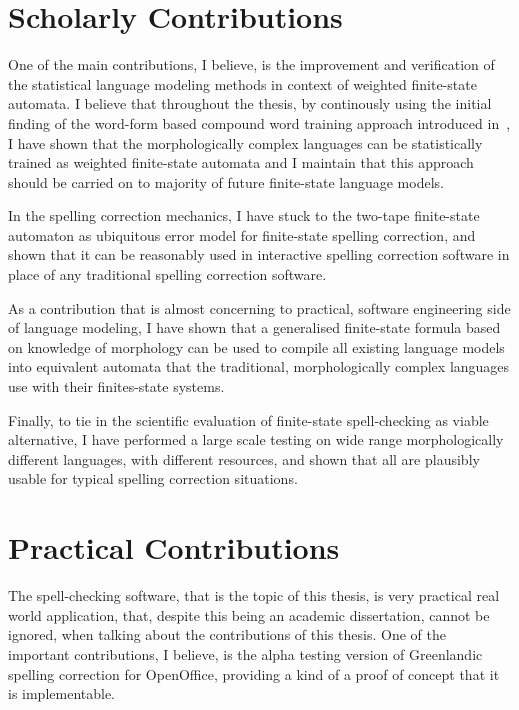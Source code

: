 \documentclass[officiallayout,draft]{unihelcompling}
\begin{document}
\section{Scholarly Contributions}
\label{sec:scholarly-contributions}

One of the main contributions, I believe, is the improvement and verification
of the statistical language modeling methods in context of weighted 
finite-state automata. I believe that throughout the thesis, by continously
using the initial finding of the word-form based compound word training
approach introduced in~\cite{pirinen2009weighted}, I have shown that the
morphologically complex languages can be statistically trained as weighted
finite-state automata and I maintain that this approach should be carried on
to majority of future finite-state language models.

In the spelling correction mechanics, I have stuck to the two-tape finite-state
automaton as ubiquitous error model for finite-state spelling correction, and
shown that it can be reasonably used in interactive spelling correction
software in place of any traditional spelling correction software.

As a contribution that is almost concerning to practical, software engineering
side of language modeling, I have shown that a generalised finite-state formula
based on knowledge of morphology can be used to compile all existing language
models into equivalent automata that the traditional, morphologically complex
languages use with their finites-state systems.

Finally, to tie in the scientific evaluation of finite-state spell-checking as
viable alternative, I have performed a large scale testing on wide range
morphologically different languages, with different resources, and shown that
all are plausibly usable for typical spelling correction situations.


\section{Practical Contributions}
\label{sec:practical-contributions}

The spell-checking software, that is the topic of this thesis, is very
practical real world application, that, despite this being an academic
dissertation, cannot be ignored, when talking about the contributions of this
thesis. One of the important contributions, I believe, is the alpha testing
version of Greenlandic spelling correction for OpenOffice, providing a kind of
a proof of concept that it is implementable.
\end{document}
